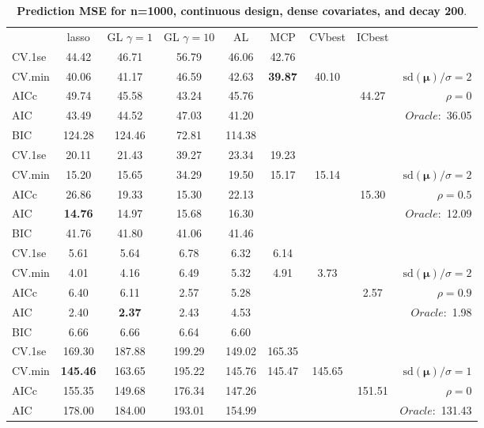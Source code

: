 \clearpage
\begin{table}\vspace{-.5cm}
\caption[l]{ { \bf Prediction MSE for n=1000, continuous design, 
dense covariates, and  decay  200}.}
\vspace{-.5cm}
\footnotesize{}
\begin{center}
\begin{tabular}{l*{7}{c}|r}
 & lasso & GL $\gamma=1$ & GL $\gamma=10$ & AL & MCP  & CVbest & ICbest  \\
\cline{1-9}
CV.1se & 44.42 & 46.71 & 56.79 & 46.06 & 42.76 & & & \\
CV.min & 40.06 & 41.17 & 46.59 & 42.63 & {\bf 39.87} & 40.10 & & $\mathrm{sd}(\mathbf{\mu})/\sigma=2$ \\
AICc & 49.74 & 45.58 & 43.24 & 45.76 & & & 44.27 &  $\rho=0$ \\
AIC & 43.49 & 44.52 & 47.03 & 41.20 & & & &  \multirow{2}{*}{$Oracle: $ 36.05} \\
BIC & 124.28 & 124.46 & 72.81 & 114.38 & & & &  \\
 \hline 
CV.1se & 20.11 & 21.43 & 39.27 & 23.34 & 19.23 & & & \\
CV.min & 15.20 & 15.65 & 34.29 & 19.50 & 15.17 & 15.14 & & $\mathrm{sd}(\mathbf{\mu})/\sigma=2$ \\
AICc & 26.86 & 19.33 & 15.30 & 22.13 & & & 15.30 &  $\rho=0.5$ \\
AIC & {\bf 14.76} & 14.97 & 15.68 & 16.30 & & & &  \multirow{2}{*}{$Oracle: $ 12.09} \\
BIC & 41.76 & 41.80 & 41.06 & 41.46 & & & &  \\
 \hline 
CV.1se & 5.61 & 5.64 & 6.78 & 6.32 & 6.14 & & & \\
CV.min & 4.01 & 4.16 & 6.49 & 5.32 & 4.91 & 3.73 & & $\mathrm{sd}(\mathbf{\mu})/\sigma=2$ \\
AICc & 6.40 & 6.11 & 2.57 & 5.28 & & & 2.57 &  $\rho=0.9$ \\
AIC & 2.40 & {\bf 2.37} & 2.43 & 4.53 & & & &  \multirow{2}{*}{$Oracle: $ 1.98} \\
BIC & 6.66 & 6.66 & 6.64 & 6.60 & & & &  \\
 \hline 
CV.1se & 169.30 & 187.88 & 199.29 & 149.02 & 165.35 & & & \\
CV.min & {\bf 145.46} & 163.65 & 195.22 & 145.76 & 145.47 & 145.65 & & $\mathrm{sd}(\mathbf{\mu})/\sigma=1$ \\
AICc & 155.35 & 149.68 & 176.34 & 147.26 & & & 151.51 &  $\rho=0$ \\
AIC & 178.00 & 184.00 & 193.01 & 154.99 & & & &  \multirow{2}{*}{$Oracle: $ 131.43} \\

\end{tabular}
\end{center}
\end{table}
